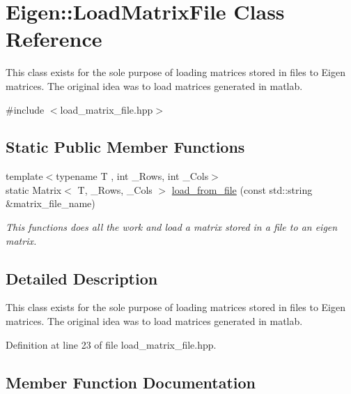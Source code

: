 \hypertarget{classEigen_1_1LoadMatrixFile}{}\section{Eigen\+:\+:Load\+Matrix\+File Class Reference}
\label{classEigen_1_1LoadMatrixFile}


This class exists for the sole purpose of loading matrices stored in files to Eigen matrices. The original idea was to load matrices generated in matlab.  




{\ttfamily \#include $<$load\+\_\+matrix\+\_\+file.\+hpp$>$}

\subsection*{Static Public Member Functions}
\begin{DoxyCompactItemize}
\item 
{\footnotesize template$<$typename T , int \+\_\+\+Rows, int \+\_\+\+Cols$>$ }\\static Matrix$<$ T, \+\_\+\+Rows, \+\_\+\+Cols $>$ \hyperlink{classEigen_1_1LoadMatrixFile_ac889e67dd87c9aeb269e97744f493167}{load\+\_\+from\+\_\+file} (const std\+::string \&matrix\+\_\+file\+\_\+name)
\begin{DoxyCompactList}\small\item\em This functions does all the work and load a matrix stored in a file to an eigen matrix. \end{DoxyCompactList}\end{DoxyCompactItemize}


\subsection{Detailed Description}
This class exists for the sole purpose of loading matrices stored in files to Eigen matrices. The original idea was to load matrices generated in matlab. 

Definition at line 23 of file load\+\_\+matrix\+\_\+file.\+hpp.



\subsection{Member Function Documentation}
